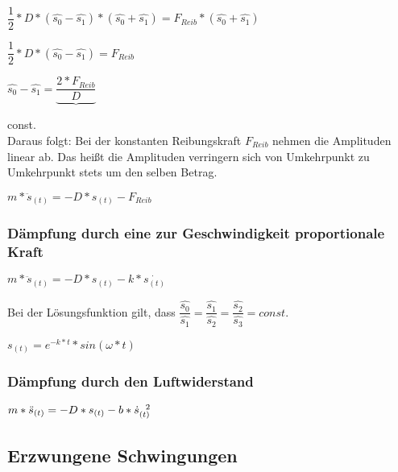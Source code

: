 \documentclass[12pt]{scrartcl}
\begin{document}
\begin{flushleft}
			\vspace{2mm}
			\hspace{4mm} $ \dfrac{1}{2} \ast D \ast (\hat{s_{0}} - \hat{s_{1}}) \ast (\hat{s_{0}} + \hat{s_{1}}) =  F_{Reib} \ast (\hat{s_{0}} + \hat{s_{1}})$
			
			\vspace{2mm}
			\hspace{25mm}$ \dfrac{1}{2} \ast D \ast (\hat{s_{0}} - \hat{s_{1}}) = F_{Reib} $
			
			\vspace{2mm}
			\hspace{43mm}$ \hat{s_{0}} - \hat{s_{1}} = \underbrace{\dfrac{2 \ast F_{Reib}}{D}} $
			
			\hspace{63mm} const. \\
			\vspace{2mm}
			Daraus folgt: Bei der konstanten Reibungskraft $F_{Reib}$ nehmen die Amplituden linear ab.  Das heißt die Amplituden verringern sich von Umkehrpunkt zu Umkehrpunkt stets um den selben Betrag.
			
			\vspace{2mm}
			$ m \ast \ddot{s}_{(t)} = -D \ast s_{(t)} - F_{Reib} $
			
			\subsubsection{Dämpfung durch eine zur Geschwindigkeit proportionale Kraft}
			
			$ m \ast \ddot{s}_{(t)} = -D \ast s_{(t)} - k \ast \dot{s_{(t)}} $
			
			Bei der Lösungsfunktion gilt, dass $ \dfrac{\hat{s_{0}}}{\hat{s_{1}}} = \dfrac{\hat{s_{1}}}{\hat{s_{2}}} = \dfrac{\hat{s_{2}}}{\hat{s_{3}}} = const.$
			
			\vspace{2mm}
			$ s_{(t)} = e^{-k \ast t} \ast sin(\omega \ast t) $
			
			\vspace{2mm}
			\subsubsection{Dämpfung durch den Luftwiderstand}
	
			$ m \ast \ddot{s}_{(t)} = -D \ast s_{(t)} - b \ast \dot{s}_{(t)}^{ \hspace{2mm}2} $
	
			\newpage
		\subsection{Erzwungene Schwingungen}
		

\end{flushleft}
\end{document}
